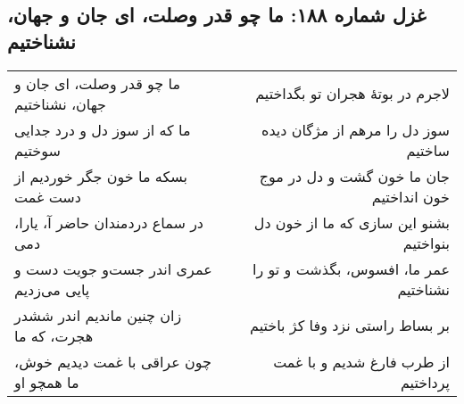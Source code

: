 \begin{center}
\section*{غزل شماره ۱۸۸: ما چو قدر وصلت، ای جان و جهان، نشناختیم}
\label{sec:188}
\begin{longtable}{l p{0.5cm} r}
ما چو قدر وصلت، ای جان و جهان، نشناختیم
&&
لاجرم در بوتهٔ هجران تو بگداختیم
\\
ما که از سوز دل و درد جدایی سوختیم
&&
سوز دل را مرهم از مژگان دیده ساختیم
\\
بسکه ما خون جگر خوردیم از دست غمت
&&
جان ما خون گشت و دل در موج خون انداختیم
\\
در سماع دردمندان حاضر آ، یارا، دمی
&&
بشنو این سازی که ما از خون دل بنواختیم
\\
عمری اندر جست‌و جویت دست و پایی می‌زدیم
&&
عمر ما، افسوس، بگذشت و تو را نشناختیم
\\
زان چنین ماندیم اندر ششدر هجرت، که ما
&&
بر بساط راستی نزد وفا کژ باختیم
\\
چون عراقی با غمت دیدیم خوش، ما همچو او
&&
از طرب فارغ شدیم و با غمت پرداختیم
\\
\end{longtable}
\end{center}
